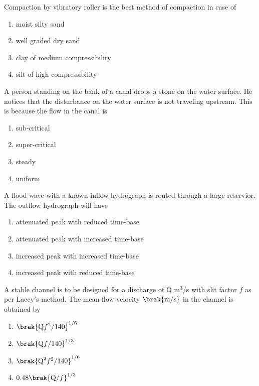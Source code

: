 \item Compaction by vibratory roller is the best method of compaction in case of

\begin{enumerate}
	\item moist silty sand
	\item well graded dry sand
	\item clay of medium compressibility
	\item silt of high compressibility
\end{enumerate}

\item A person standing on the bank of a canal drops a stone on the water surface. He notices that the disturbance on the water surface is not traveling upstream. This is because the flow in the canal is

\begin{enumerate}
	\item sub-critical
	\item super-critical
	\item steady
	\item uniform
\end{enumerate}

\item A flood wave with a known inflow hydrograph is routed through a large reservior. The outflow hydrograph will have

\begin{enumerate}
	\item attenuated peak with reduced time-base
	\item attenuated peak with increased time-base
	\item increased peak with increased time-base
	\item increased peak with reduced time-base
\end{enumerate}

\item A stable channel is to be designed for a discharge of Q m$^3$/s with slit factor $f$ as per Lacey's method. The mean flow velocity $\brak{\text{m/s}}$ in the channel is obtained by

\begin{enumerate}
	\item $\brak{\text{Q}f^2/140}^{1/6}$
	\item $\brak{\text{Q}f/140}^{1/3}$
	\item $\brak{\text{Q}^2f^2/140}^{1/6}$
	\item $0.48\brak{\text{Q}/f}^{1/3}$
\end{enumerate}

